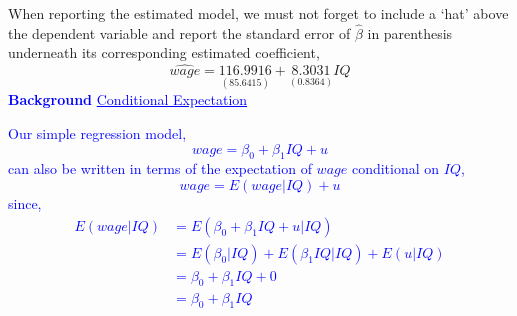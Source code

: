 \documentclass[12pt]{report}
\newenvironment{blueframed}[1][blue]
{\def\FrameCommand{\fboxsep=\FrameSep\fcolorbox{#1}{white}}%
\MakeFramed {\advance\hsize-\width \FrameRestore}}
{\endMakeFramed}
\begin{document}
\vspace{-\baselineskip}
\noindent When reporting the estimated model, we must not forget to include a `hat' above the dependent variable and report the standard error of $\hat{\beta}$ in parenthesis underneath its corresponding estimated coefficient,
$$\widehat{wage} = \underset{(85.6415)}{116.9916} + \underset{(0.8364)}{8.3031}IQ$$
\justify
\begin{blueframed}
	\textcolor{blue}{\textbf{Background}}
	\vspace{-\baselineskip}
	\justify
	\textcolor{blue}{\underline{Conditional Expectation}}
	
	\noindent \textcolor{blue}
	{
	Our simple regression model,
	$$wage = \beta_0+\beta_1IQ+u$$
	can also be written in terms of the expectation of $wage$ conditional on $IQ$,
	$$wage = E(wage|IQ)+u$$ 
	since,
	\begin{align*}
	E(wage|IQ) &= E(\beta_0+\beta_1IQ+u|IQ) \\
	&= E(\beta_0|IQ) + E(\beta_1IQ|IQ) + E(u|IQ) \\ 
	&= \beta_0 + \beta_1 IQ + 0 \\ &= \beta_0 + \beta_1 IQ
	\end{align*}	
	}
\end{blueframed}
\end{document}
